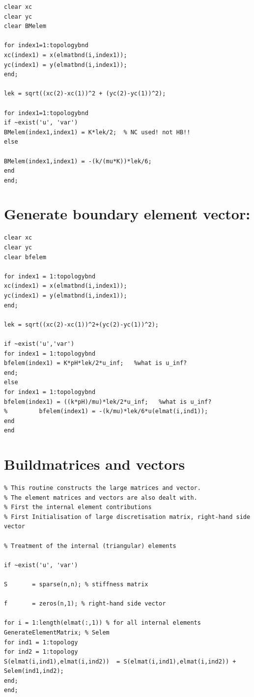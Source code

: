 \documentclass[a4paper]{report}
\begin{document}
\begin{appendices}
\begin{lstlisting}
clear xc
clear yc
clear BMelem

for index1=1:topologybnd
xc(index1) = x(elmatbnd(i,index1));
yc(index1) = y(elmatbnd(i,index1));
end;

lek = sqrt((xc(2)-xc(1))^2 + (yc(2)-yc(1))^2);

for index1=1:topologybnd
if ~exist('u', 'var')
BMelem(index1,index1) = K*lek/2;  % NC used! not HB!!
else

BMelem(index1,index1) = -(k/(mu*K))*lek/6;
end
end;
\end{lstlisting}



\section{Generate boundary element vector:}

\begin{lstlisting}
clear xc
clear yc
clear bfelem

for index1 = 1:topologybnd
xc(index1) = x(elmatbnd(i,index1));
yc(index1) = y(elmatbnd(i,index1));
end;

lek = sqrt((xc(2)-xc(1))^2+(yc(2)-yc(1))^2);

if ~exist('u','var')
for index1 = 1:topologybnd
bfelem(index1) = K*pH*lek/2*u_inf;   %what is u_inf?
end;
else
for index1 = 1:topologybnd
bfelem(index1) = ((k*pH)/mu)*lek/2*u_inf;   %what is u_inf?
%         bfelem(index1) = -(k/mu)*lek/6*u(elmat(i,ind1));
end
end
\end{lstlisting}

\section{Buildmatrices and vectors}

\begin{lstlisting}
% This routine constructs the large matrices and vector.
% The element matrices and vectors are also dealt with.
% First the internal element contributions
% First Initialisation of large discretisation matrix, right-hand side vector

% Treatment of the internal (triangular) elements

if ~exist('u', 'var')  

S 		= sparse(n,n); % stiffness matrix

f 		= zeros(n,1); % right-hand side vector

for i = 1:length(elmat(:,1)) % for all internal elements
GenerateElementMatrix; % Selem	
for ind1 = 1:topology
for ind2 = 1:topology
S(elmat(i,ind1),elmat(i,ind2))	= S(elmat(i,ind1),elmat(i,ind2)) + Selem(ind1,ind2);
end;
end;


\end{lstlisting}
\end{appendices}
\end{document}
